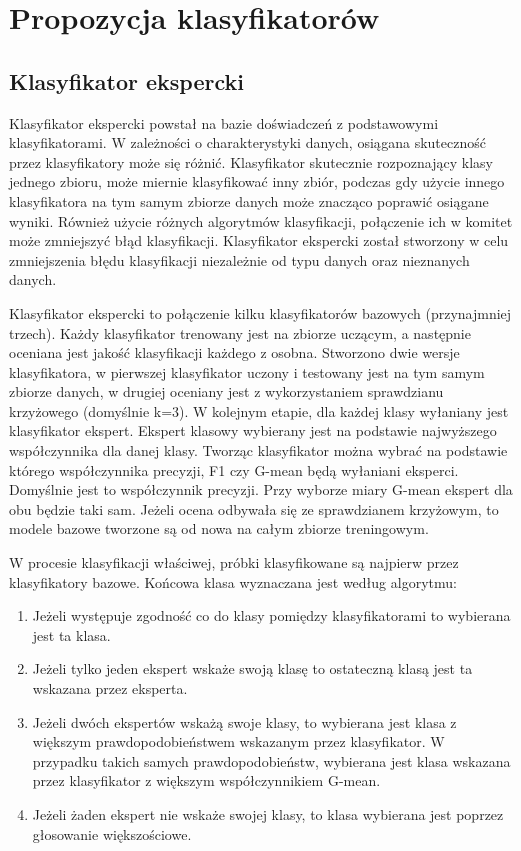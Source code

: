 \chapter{Propozycja klasyfikatorów}
\section{Klasyfikator ekspercki}
Klasyfikator ekspercki powstał na bazie doświadczeń z podstawowymi klasyfikatorami. W zależności o charakterystyki danych, osiągana skuteczność przez klasyfikatory może się różnić. Klasyfikator skutecznie rozpoznający klasy jednego zbioru, może miernie klasyfikować inny zbiór, podczas gdy użycie innego klasyfikatora na tym samym zbiorze danych może znacząco poprawić osiągane wyniki. Również użycie różnych algorytmów klasyfikacji, połączenie ich w komitet może zmniejszyć błąd klasyfikacji. 
Klasyfikator ekspercki został stworzony w celu zmniejszenia błędu klasyfikacji niezależnie od typu danych oraz nieznanych danych. \par
Klasyfikator ekspercki to połączenie kilku klasyfikatorów bazowych (przynajmniej trzech). Każdy klasyfikator trenowany jest na zbiorze uczącym, a następnie oceniana jest jakość klasyfikacji każdego z osobna. Stworzono dwie wersje klasyfikatora, w pierwszej klasyfikator uczony i testowany jest na tym samym zbiorze danych, w drugiej oceniany jest z wykorzystaniem sprawdzianu krzyżowego (domyślnie k=3). W kolejnym etapie, dla każdej klasy wyłaniany jest klasyfikator ekspert. Ekspert klasowy wybierany jest na podstawie najwyższego współczynnika dla danej klasy. Tworząc klasyfikator można wybrać na podstawie którego współczynnika precyzji, F1 czy G-mean będą wyłaniani eksperci. Domyślnie jest to współczynnik precyzji. Przy wyborze miary G-mean ekspert dla obu będzie taki sam. Jeżeli ocena odbywała się ze sprawdzianem krzyżowym, to modele bazowe tworzone są od nowa na całym zbiorze treningowym. \par
W procesie klasyfikacji właściwej, próbki klasyfikowane są najpierw przez klasyfikatory bazowe. Końcowa klasa wyznaczana jest według algorytmu:
\begin{enumerate}
	\item Jeżeli występuje zgodność co do klasy pomiędzy klasyfikatorami to wybierana jest ta klasa.
	\item Jeżeli tylko jeden ekspert wskaże swoją klasę to ostateczną klasą jest ta wskazana przez eksperta.
	\item Jeżeli dwóch ekspertów wskażą swoje klasy, to wybierana jest klasa z większym prawdopodobieństwem wskazanym przez klasyfikator. W przypadku takich samych prawdopodobieństw, wybierana jest klasa wskazana przez klasyfikator z większym współczynnikiem G-mean.
	\item Jeżeli żaden ekspert nie wskaże swojej klasy, to klasa wybierana jest poprzez głosowanie większościowe.
\end{enumerate}
